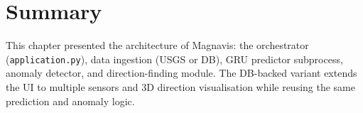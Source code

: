 \section*{Summary}
This chapter presented the architecture of Magnavis: the orchestrator (\texttt{application.py}), data ingestion (USGS or DB), GRU predictor subprocess, anomaly detector, and direction-finding module. The DB-backed variant extends the UI to multiple sensors and 3D direction visualisation while reusing the same prediction and anomaly logic.

